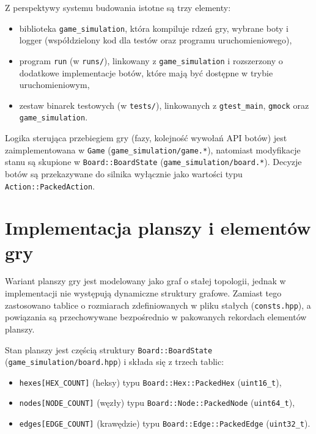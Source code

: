 \documentclass[polish,inz,longabstract]{iithesis}
\begin{document}
Z perspektywy systemu budowania istotne są trzy elementy:

\begin{itemize}
\item biblioteka \texttt{game\_simulation}, która kompiluje rdzeń gry, wybrane boty i logger (współdzielony kod dla testów oraz programu uruchomieniowego),
\item program \texttt{run} (w \texttt{runs/}), linkowany z \texttt{game\_simulation} i rozszerzony o dodatkowe implementacje botów, które mają być dostępne w trybie uruchomieniowym,
\item zestaw binarek testowych (w \texttt{tests/}), linkowanych z \texttt{gtest\_main}, \texttt{gmock} oraz \texttt{game\_simulation}.
\end{itemize}

Logika sterująca przebiegiem gry (fazy, kolejność wywołań API botów) jest zaimplementowana w \texttt{Game} (\texttt{game\_simulation/game.*}), natomiast modyfikacje stanu są skupione w \texttt{Board::BoardState} (\texttt{game\_simulation/board.*}). Decyzje botów są przekazywane do silnika wyłącznie jako wartości typu \texttt{Action::PackedAction}.


\section{Implementacja planszy i elementów gry}

Wariant planszy gry jest modelowany jako graf o stałej topologii, jednak w implementacji nie występują dynamiczne struktury grafowe. Zamiast tego zastosowano tablice o rozmiarach zdefiniowanych w pliku stałych (\texttt{consts.hpp}), a powiązania są przechowywane bezpośrednio w pakowanych rekordach elementów planszy.

Stan planszy jest częścią struktury \texttt{Board::BoardState} \newline (\texttt{game\_simulation/board.hpp}) i składa się z trzech tablic:

\begin{itemize}
\item \texttt{hexes[HEX\_COUNT]} (heksy) typu \texttt{Board::Hex::PackedHex} (\texttt{uint16\_t}),
\item \texttt{nodes[NODE\_COUNT]} (węzły) typu \texttt{Board::Node::PackedNode} (\texttt{uint64\_t}),
\item \texttt{edges[EDGE\_COUNT]} (krawędzie) typu \texttt{Board::Edge::PackedEdge} (\texttt{uint32\_t}).
\end{itemize}
\end{document}
